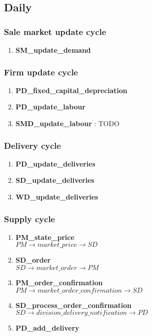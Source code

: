 \documentclass[11pt]{article}
\begin{document}
\subsection{Daily}

\subsubsection{Sale market update cycle}
\begin{enumerate}
	\item \textbf{SM\_update\_demand}
\end{enumerate}

\subsubsection{Firm update cycle}
\begin{enumerate}
	\item \textbf{PD\_fixed\_capital\_depreciation}
	\item \textbf{PD\_update\_labour}
	\item \textbf{SMD\_update\_labour} : TODO
\end{enumerate}

\subsubsection{Delivery cycle}
\begin{enumerate}
	\item \textbf{PD\_update\_deliveries}
	\item \textbf{SD\_update\_deliveries}
	\item \textbf{WD\_update\_deliveries}
\end{enumerate}

\subsubsection{Supply cycle}
\begin{enumerate}
	\item \textbf{PM\_state\_price} \\
	$ PM \rightarrow market\_price \rightarrow SD $
	\item \textbf{SD\_order} \\
	$ SD \rightarrow market\_order \rightarrow PM $
	\item \textbf{PM\_order\_confirmation} \\
	$ PM \rightarrow market\_order\_confirmation \rightarrow SD $
	\item \textbf{SD\_process\_order\_confirmation} \\
	$ SD \rightarrow division\_delivery\_notification \rightarrow PD $
	\item \textbf{PD\_add\_delivery}
		
\end{enumerate}
\end{document}
